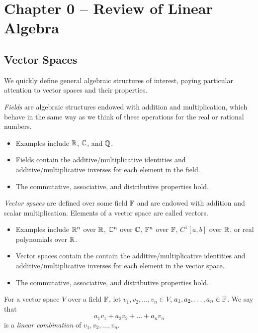 \section{Chapter 0 -- Review of Linear Algebra}

\subsection{Vector Spaces}
\label{subsection:vector-spaces}
We quickly define general algebraic structures of interest, paying particular attention to vector spaces and their properties.

\begin{definition}[Field]
    \label{def:field}
    \textit{Fields} are algebraic structures endowed with addition and multiplication, which behave in the same way as we think of these operations for the real or rational numbers.
\end{definition}
\begin{itemize}
    \item Examples include $\mathbb R$, $\mathbb C$, and $\mathbb Q$.
    \item Fields contain the additive/multiplicative identities and additive/multiplicative inverses for each element in the field.
    \item The commutative, associative, and distributive properties hold.
\end{itemize}

\begin{definition}
    \label{def:vector-space}
    \textit{Vector spaces} are defined over some field $\mathbb F$ and are endowed with addition and scalar multiplication. Elements of a vector space are called vectors.
\end{definition}
\begin{itemize}
    \item Examples include $\mathbb R^n$ over $\mathbb R$, $\mathbb C^n$ over $\mathbb C$, $\mathbb F^n$ over $\mathbb F$, $C^1[a,b]$ over $\mathbb R$, or real polynomials over $\mathbb R$.
    \item Vector spaces contain the contain the additive/multiplicative identities and additive/multiplicative inverses for each element in the vector space.
    \item The commutative, associative, and distributive properties hold.
\end{itemize}

\begin{definition}
\label{def:linear-combination}
For a vector space $V$ over a field $\mathbb F$, let $v_1, v_2,\dots, v_n \in V$, $a_1, a_2, \dots, a_n \in \mathbb F$. We say that
$$
a_1v_1 + a_2v_2 + \dots + a_nv_n
$$
is a \textit{linear combination} of $v_1, v_2, \dots, v_n$.
\end{definition}

